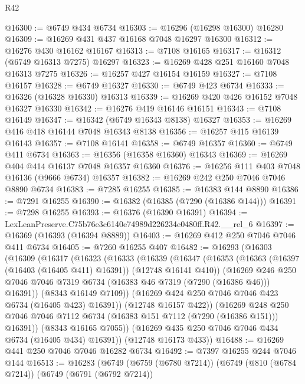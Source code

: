 \begin{lexlean}{R42}
\begin{coremodule}
{@16300 := @6749 @434 @6734
@16303 := @16296 (@16298 @16300) @16280
@16309 := @16269 @431 @437 @16168 @7048 @16297 @16300
@16312 := @16276 @430 @16162 @16167
@16313 := @7108 @16165
@16317 := @16312 (@6749 @16313 @7275) @16297
@16323 := @16269 @428 @251 @16160 @7048 @16313 @7275
@16326 := @16257 @427 @16154 @16159
@16327 := @7108 @16157
@16328 := @6749 @16327
@16330 := @6749 @423 @6734
@16333 := @16326 (@16328 @16330) @16313
@16339 := @16269 @420 @426 @16152 @7048 @16327 @16330
@16342 := @16276 @419 @16146 @16151
@16343 := @7108 @16149
@16347 := @16342 (@6749 @16343 @8138) @16327
@16353 := @16269 @416 @418 @16144 @7048 @16343 @8138
@16356 := @16257 @415 @16139 @16143
@16357 := @7108 @16141
@16358 := @6749 @16357
@16360 := @6749 @411 @6734
@16363 := @16356 (@16358 @16360) @16343
@16369 := @16269 @404 @414 @16137 @7048 @16357 @16360
@16376 := @16256 @111 @403 @7048 @16136 (@9666 @6734) @16357
@16382 := @16269 @242 @250 @7046 @7046 @8890 @6734
@16383 := @7285 @16255
@16385 := @16383 @144 @8890
@16386 := @7291 @16255
@16390 := @16382 (@16385 (@7290 (@16386 @144)))
@16391 := @7298 @16255
@16393 := @16376 (@16390 @16391)
@16394 := LexLeanPreserve.C75b76e3c6140e74989d226234e0480ff.R42.__rel_6
@16397 := @16369 (@16393 (@16394 @8889))
@16403 := @16269 @412 @250 @7046 @7046 @411 @6734
@16405 := @7260 @16255 @407
@16482 := @16293
    (@16303
      (@16309
        (@16317
          (@16323
            (@16333
              (@16339
                (@16347
                  (@16353
                    (@16363 (@16397 (@16403 (@16405 @411) @16391)) (@12748 @16141 @410))
                    (@16269
                      @246
                      @250
                      @7046
                      @7046
                      @7319
                      @6734
                      (@16383 @46 @7319 (@7290 (@16386 @46)))
                      @16391))
                  (@8343 @16149 @7109))
                (@16269 @424 @250 @7046 @7046 @423 @6734 (@16405 @423) @16391))
              (@12748 @16157 @422))
            (@16269
              @248
              @250
              @7046
              @7046
              @7112
              @6734
              (@16383 @151 @7112 (@7290 (@16386 @151)))
              @16391))
          (@8343 @16165 @7055))
        (@16269 @435 @250 @7046 @7046 @434 @6734 (@16405 @434) @16391))
      (@12748 @16173 @433))
@16488 := @16269 @441 @250 @7046 @7046 @16282 @6734
@16492 := @7397 @16255 @244 @7046 @144
@16513 := @16283
    (@6749
      (@6759 (@6780 @7214))
      (@6749
        (@810 (@6784 @7214))
        (@6749
          (@6791 (@6792 @7214))
}
\end{coremodule}
\end{lexlean}

